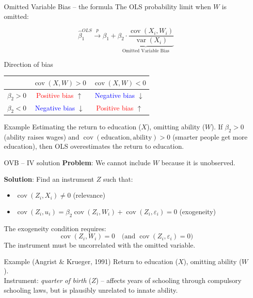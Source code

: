 \documentclass[10pt]{beamer}
\begin{document}
\begin{frame}{Omitted Variable Bias -- the formula}
\label{slide:ovb_formula}
The OLS probability limit when $W$ is omitted:

\[
\widehat{\beta}_1^{OLS} \xrightarrow{p} \beta_1 + \underbrace{\beta_2 \cdot \frac{\operatorname{cov}(X_i, W_i)}{\operatorname{var}(X_i)}}_{\text{Omitted Variable Bias}}
\]

\pause
\begin{block}{Direction of bias}
\begin{center}
\begin{tabular}{lcc}
\toprule
& $\operatorname{cov}(X, W) > 0$ & $\operatorname{cov}(X, W) < 0$ \\
\midrule
$\beta_2 > 0$ & \textcolor{red}{Positive bias} $\uparrow$ & \textcolor{blue}{Negative bias} $\downarrow$ \\
$\beta_2 < 0$ & \textcolor{blue}{Negative bias} $\downarrow$ & \textcolor{red}{Positive bias} $\uparrow$ \\
\bottomrule
\end{tabular}
\end{center}
\end{block}

\pause
\begin{exampleblock}{Example}
Estimating the return to education ($X$), omitting ability ($W$). If $\beta_2 > 0$ (ability raises wages) and $\operatorname{cov}(\text{education}, \text{ability}) > 0$ (smarter people get more education), then OLS \alert{overestimates} the return to education.
\end{exampleblock}
\end{frame}

\begin{frame}{OVB -- IV solution}
\label{slide:ovb_iv}
\textbf{Problem}: We cannot include $W$ because it is unobserved.

\textbf{Solution}: Find an instrument $Z$ such that:
\begin{itemize}
  \item $\operatorname{cov}(Z_i, X_i) \neq 0$ \quad (relevance)
  \item $\operatorname{cov}(Z_i, u_i) = \beta_2 \operatorname{cov}(Z_i, W_i) + \operatorname{cov}(Z_i, \varepsilon_i) = 0$ \quad (exogeneity)
\end{itemize}

\pause
The exogeneity condition requires:
\[
\operatorname{cov}(Z_i, W_i) = 0 \quad \text{(and } \operatorname{cov}(Z_i, \varepsilon_i) = 0\text{)}
\]
The instrument must be \alert{uncorrelated with the omitted variable}.

\pause
\vspace{0.5em}
\begin{exampleblock}{Example (Angrist \& Krueger, 1991)}
Return to education ($X$), omitting ability ($W$).\\
Instrument: \emph{quarter of birth} ($Z$) -- affects years of schooling through compulsory schooling laws, but is plausibly unrelated to innate ability.
\end{exampleblock}
\end{frame}
\end{document}
